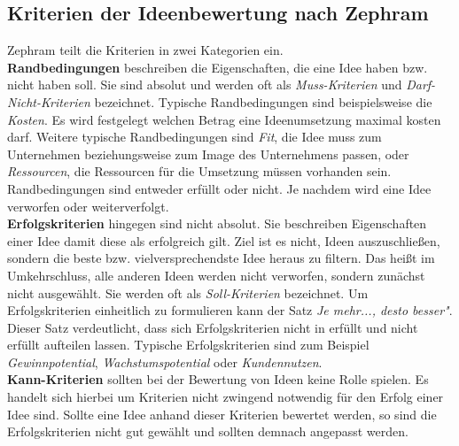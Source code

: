 \subsection{Kriterien der Ideenbewertung nach Zephram}
Zephram teilt die Kriterien in zwei Kategorien ein. \\
\textbf{Randbedingungen} beschreiben die Eigenschaften, die eine Idee haben 
bzw. nicht haben soll. Sie sind absolut und werden oft als \textit{Muss-Kriterien}
und \textit{Darf-Nicht-Kriterien} bezeichnet.
Typische Randbedingungen sind beispielsweise die \textit{Kosten}. 
Es wird festgelegt welchen Betrag eine Ideenumsetzung maximal kosten darf. 
Weitere typische Randbedingungen sind \textit{Fit}, die Idee muss zum Unternehmen 
beziehungsweise zum Image des Unternehmens passen, oder \textit{Ressourcen}, die Ressourcen für die
Umsetzung müssen vorhanden sein. 
Randbedingungen sind entweder erfüllt oder nicht. Je nachdem wird eine Idee verworfen oder 
weiterverfolgt. \\
\textbf{Erfolgskriterien} hingegen sind nicht absolut. Sie beschreiben Eigenschaften einer Idee 
damit diese als erfolgreich gilt. Ziel ist es nicht, Ideen auszuschließen, sondern die beste bzw. 
vielversprechendste Idee heraus zu filtern. Das heißt im Umkehrschluss, alle anderen Ideen werden nicht 
verworfen, sondern zunächst nicht ausgewählt. Sie werden oft als \textit{Soll-Kriterien} bezeichnet. Um 
Erfolgskriterien einheitlich zu formulieren kann der Satz \textit{Je mehr..., desto besser"}.
Dieser Satz verdeutlicht, dass sich Erfolgskriterien nicht in erfüllt und nicht erfüllt aufteilen 
lassen. Typische Erfolgskriterien sind zum Beispiel \textit{Gewinnpotential}, \textit{Wachstumspotential} oder \textit{Kundennutzen}.\\
\textbf{Kann-Kriterien} sollten bei der Bewertung von Ideen keine Rolle spielen. Es handelt sich hierbei 
um Kriterien nicht zwingend notwendig für den Erfolg einer Idee sind. Sollte eine Idee anhand dieser Kriterien 
bewertet werden, so sind die Erfolgskriterien nicht gut gewählt und sollten demnach angepasst werden.


